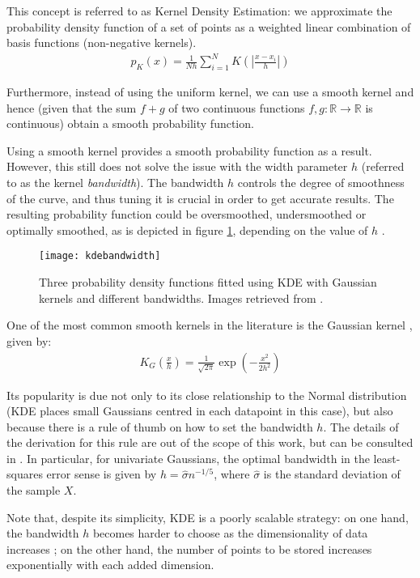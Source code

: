 \documentclass[../main.tex]{subfiles}
\begin{document}
\par This concept is referred to as Kernel Density Estimation: we approximate the probability density function of a set of points as a weighted linear combination of basis functions (non-negative kernels). 
\begin{align*}
p_K(x) = \frac{1}{Nh}\sum_{i=1}^NK\left(\left|\frac{x - x_i}{h}\right|\right)
\end{align*}
\par Furthermore, instead of using the uniform kernel, we can use a smooth kernel and hence (given that the sum $f+g$ of two continuous functions $f, g: \mathbb{R} \rightarrow \mathbb{R}$ is continuous) obtain a smooth probability function. 
\par Using a smooth kernel provides a smooth probability function as a result. However, this still does not solve the issue with the width parameter $h$ (referred to as the kernel \emph{bandwidth}). The bandwidth $h$ controls the degree of smoothness of the curve, and thus tuning it is crucial in order to get accurate results. The resulting probability function could be oversmoothed, undersmoothed or optimally smoothed, as is depicted in figure \ref{fig_kdebandwidths}, depending on the value of $h$ \cite{Duong2004}.
\begin{figure}[t]
\centering
\texttt{[image: kdebandwidth]}
\caption{Three probability density functions fitted using KDE with Gaussian kernels and different bandwidths. Images retrieved from \cite{Duong2004}.}
\label{fig_kdebandwidths}
\end{figure}
\par One of the most common smooth kernels in the literature is the Gaussian kernel \cite{hastie2008}, given by:
\begin{align*}
K_G\left(\frac{x}{h}\right) = \frac{1}{\sqrt{2\pi}}\exp{\left(-\frac{x^2}{2h^2}\right)}
\end{align*}
\par Its popularity is due not only to its close relationship to the Normal distribution (KDE places small Gaussians centred in each datapoint in this case), but also because there is a rule of thumb on how to set the bandwidth $h$. The details of the derivation for this rule are out of the scope of this work, but can be consulted in \cite{Hansen2009}. In particular, for univariate Gaussians, the optimal bandwidth in the least-squares error sense is given by $h = \hat{\sigma}n^{-1/5}$, where $\hat{\sigma}$ is the standard deviation of the sample $X$.
\par Note that, despite its simplicity, KDE is a poorly scalable strategy: on one hand, the bandwidth $h$ becomes harder to choose as the dimensionality of data increases \cite{Hansen2009}; on the other hand, the number of points to be stored increases exponentially with each added dimension.
\end{document}
